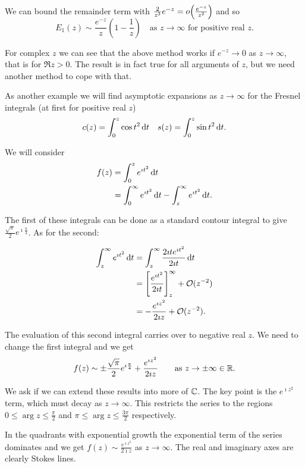 \documentclass{notes}
\newcommand{\cO}{\mathcal{O}}
\theoremstyle{plain}
\begin{document}
We can bound the remainder term with
$\frac{2}{z^3} e^{-z} = o\smash{\left(\tfrac{e^{-z}}{z^2}\right)}$ and so
\[
E_1(z) \sim \frac{e^{-z}}{z} \left( 1 - \frac{1}{z} \right)
\quad \text{as $z \to \infty$ for positive real $z$.}
\]

For complex $z$ we can see that the above method works if $e^{-z}
\to 0$ as $z \to \infty$, that is for $\Re z > 0$.  The result is
in fact true for all arguments of $z$, but we need another method to
cope with that.

As another example we will find asymptotic expansions as $z \to \infty$
for the Fresnel integrals (at first for positive real $z$)
\begin{align*}
c(z) = \int_0^z \cos t^2\, \mathrm{d} t && s(z) = \int_0^z \sin t^2\, \mathrm{d} t.
\end{align*}

We will consider
\begin{align*}
f(z) &= \int_0^z e^{\imath t^2}\, \mathrm{d} t \\
&= \int_0^\infty e^{\imath t^2}\, \mathrm{d} t - \int_z^\infty e^{\imath t^2}\,
\mathrm{d} t.
\end{align*}

The first of these integrals can be done as a standard contour integral
to give $\tfrac{\sqrt{\pi}}{2} e^{\imath \frac{\pi}{4}}$.  As for the
second:

\begin{align*}
\int_z^\infty e^{\imath t^2}\, \ud t &= \int_z^\infty \frac{2 \imath t
e^{\imath t^2}}{2 \imath t}\, \ud t \\
&= \left[ \frac{e^{\imath t^2}}{2 \imath t}\right]_z^\infty + \cO(z^{-2}) \\
&= - \frac{e^{\imath z^2}}{2 \imath z} + \cO(z^{-2}).
\end{align*}

The evaluation of this second integral carries over to negative real $z$.
We need to change the first integral and we get
\[
f(z) \sim \pm \frac{\sqrt{\pi}}{2} e^{\imath \frac{\pi}{4}} +
\frac{e^{\imath z^2}}{2 \imath z} \qquad \text{as } z \to \pm \infty \in \mathbb{R}.
\]

We ask if we can extend these results into more of $\mathbb{C}$.  The key point
is the $e^{\imath z^2}$ term, which must decay as $z \to \infty$.  This
restricts the series to the regions $0 \le \arg z \le \frac{\pi}{2}$
and $\pi \le \arg z \le \frac{3 \pi}{2}$ respectively.

\vspace{1in}

In the quadrants with exponential growth the exponential term of the
series dominates and we get $f(z) \sim \frac{e^{\imath z^2}}{2 \imath z}$
as $z \to \infty$.  The real and imaginary axes are clearly Stokes lines.
\end{document}
